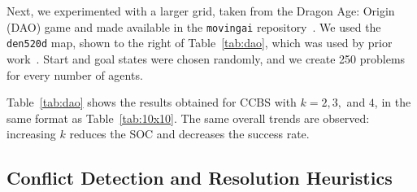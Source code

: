 \documentclass[review]{elsarticle}
\newcommand{\commentout}[1]{ }
\newcommand\roni[1]{\nb{\textbf{Roni:}}{green}{#1}}
\newcommand{\ccbs}{\ac{CCBS}\xspace}
\begin{document}
Next, we experimented with a larger grid, taken from the Dragon Age: Origin (DAO) game and made available in the \texttt{movingai} repository~\cite{sturtevant2012benchmarks}. We used the \texttt{den520d} map, shown to the right of Table~\ref{tab:dao}, which was used by prior work~\cite{sharon2015conflict}. 
Start and goal states were chosen randomly, and we create 250 problems for every number of agents.
\commentout{
\begin{figure}
    \centering
    \texttt{[image: runtime-dao\_cropped.pdf]}
    \caption{The average runtime for the DAO map.}
    \label{fig:dao-runtime}
\end{figure}
}
Table~\ref{tab:dao} shows the results obtained for \ccbs with $k=2,3,$ and $4$, 
in the same format as Table~\ref{tab:10x10}. The same overall trends are observed: increasing $k$ reduces the SOC and decreases the success rate. %



\subsection{Conflict Detection and Resolution Heuristics}


\end{document}
